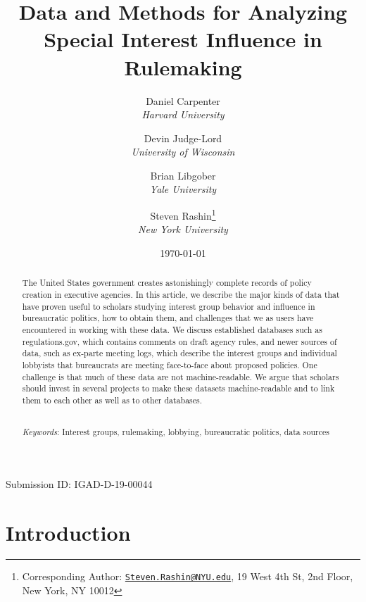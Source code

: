\documentclass[
      12pt,
        ]{article}
\title{Data and Methods for Analyzing Special Interest Influence in Rulemaking}
\author{ %
            Daniel Carpenter  \\ \emph{Harvard University} 
             \and 
            Devin Judge-Lord  \\ \emph{University of Wisconsin} 
             \and 
            Brian Libgober  \\ \emph{Yale University} 
             \and 
            Steven Rashin\footnote{Corresponding Author:
\href{mailto:Steven.Rashin@NYU.edu}{\nolinkurl{Steven.Rashin@NYU.edu}},
19 West 4th St, 2nd Floor, New York, NY 10012}  \\ \emph{New York University} 
            }
\date{\today}
\begin{document}
 


  \maketitle




  \begin{abstract}
    \noindent The United States government creates astonishingly complete records of
policy creation in executive agencies. In this article, we describe the
major kinds of data that have proven useful to scholars studying
interest group behavior and influence in bureaucratic politics, how to
obtain them, and challenges that we as users have encountered in working
with these data. We discuss established databases such as
regulations.gov, which contains comments on draft agency rules, and
newer sources of data, such as ex-parte meeting logs, which describe the
interest groups and individual lobbyists that bureaucrats are meeting
face-to-face about proposed policies. One challenge is that much of
these data are not machine-readable. We argue that scholars should
invest in several projects to make these datasets machine-readable and
to link them to each other as well as to other databases. 

          \hfill \\ 
      \noindent \emph{Keywords}: Interest groups, rulemaking, lobbying, bureaucratic politics, data
sources 
    
  \end{abstract}









  \newpage

\noindent 
      \doublespacing 
    \noindent Submission ID: IGAD-D-19-00044

\hypertarget{introduction}{%
\section{Introduction}\label{introduction}}
\end{document}
